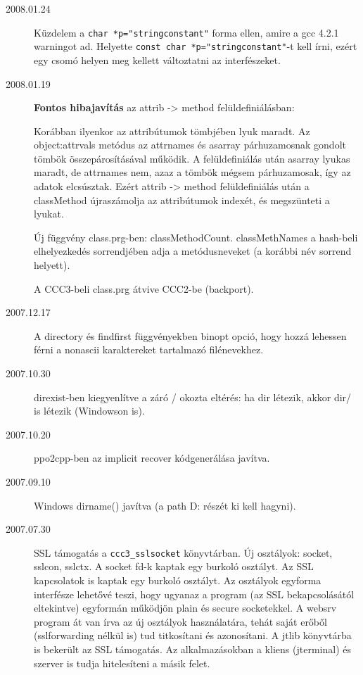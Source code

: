 \begin{description}
\item[2008.01.24]
  Küzdelem a \verb!char *p="stringconstant"! forma ellen,
  amire a gcc 4.2.1 warningot ad.
  Helyette \verb!const char *p="stringconstant"!-t kell írni,
  ezért egy csomó helyen meg kellett változtatni az interfészeket.

\item[2008.01.19]
  {\bf Fontos hibajavítás} az attrib -> method felüldefiniálásban:

  Korábban ilyenkor az attribútumok tömbjében lyuk maradt. 
  Az  object:attrvals metódus az attrnames és asarray
  párhuzamosnak gondolt tömbök összepárosításával működik.
  A felüldefiniálás után asarray lyukas maradt, de attrnames nem,
  azaz a tömbök mégsem párhuzamosak, így az adatok elcsúsztak.
  Ezért attrib -> method felüldefiniálás után a classMethod
  újraszámolja az attribútumok indexét, és megszünteti a lyukat.
 
  Új függvény class.prg-ben: classMethodCount.
  classMethNames a hash-beli elhelyezkedés sorrendjében adja
  a metódusneveket (a korábbi név sorrend helyett).
  
  A CCC3-beli class.prg átvive CCC2-be (backport).

\item[2007.12.17]
  A directory és findfirst függvényekben binopt opció,
  hogy hozzá lehessen férni a nonascii karaktereket tartalmazó
  filénevekhez.

\item[2007.10.30]
  direxist-ben kiegyenlítve a záró / okozta eltérés:
  ha dir létezik, akkor dir/ is létezik (Windowson is).

\item[2007.10.20]
  ppo2cpp-ben az implicit recover kódgenerálása javítva.

\item[2007.09.10]
  Windows dirname() javítva (a path D: részét ki kell hagyni).

\label{20070730}
\item[2007.07.30]
  SSL támogatás a \verb!ccc3_sslsocket! könyvtárban.
  Új osztályok: socket, sslcon, sslctx.
  A socket fd-k kaptak egy burkoló osztályt. 
  Az SSL kapcsolatok is kaptak egy burkoló osztályt.
  Az osztályok  egyforma interfésze lehetővé teszi, 
  hogy ugyanaz a program (az SSL bekapcsolásától eltekintve) 
  egyformán működjön plain és secure socketekkel.
  A websrv program át van írva az új osztályok használatára,
  tehát saját erőből (sslforwarding nélkül is) tud titkosítani és azonosítani.
  A jtlib könyvtárba is bekerült az SSL támogatás. 
  Az alkalmazásokban a kliens (jterminal) és szerver is 
  tudja hitelesíteni a másik felet.
  

\end{description}

